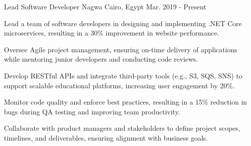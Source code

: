 

\begin{cventries}

  \cventry
    {Lead Software Developer} %
    {Nagwa} %
    {Cairo, Egypt} %
    {Mar. 2019 - Present} %
    {
      \begin{cvitems} %
        \item {Lead a team of software developers in designing and implementing .NET Core microservices, resulting in a 30\% improvement in website performance.}
        \item {Oversee Agile project management, ensuring on-time delivery of applications while mentoring junior developers and conducting code reviews.}
        \item {Develop RESTful APIs and integrate third-party tools (e.g., S3, SQS, SNS) to support scalable educational platforms, increasing user engagement by 20\%.}
        \item {Monitor code quality and enforce best practices, resulting in a 15\% reduction in bugs during QA testing and improving team productivity.}
        \item {Collaborate with product managers and stakeholders to define project scopes, timelines, and deliverables, ensuring alignment with business goals.}
      \end{cvitems}
    }


\end{cventries}
